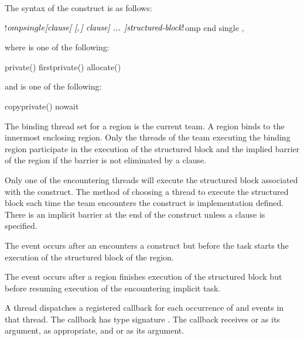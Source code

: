 \begin{fortranspecific}
The syntax of the  construct is as follows:

\begin{ompfPragma}
!$omp single \plc{[clause[ [},\plc{] clause] ... ]}
   \plc{structured-block}
!$omp end single \plc{[end_clause[ [},\plc{] end_clause] ... ]}
\end{ompfPragma}

where  is one of the following:

\begin{indentedcodelist}
private()
firstprivate()
allocate(\plc{[allocator: ]})
\end{indentedcodelist}

and  is one of the following:

\begin{indentedcodelist}
copyprivate()
nowait
\end{indentedcodelist}
\end{fortranspecific}

\binding
The binding thread set for a  region is the current team. A  region
binds to the innermost enclosing  region. Only the threads of the team
executing the binding  region participate in the execution of the structured
block and the implied barrier of the  region if the barrier is not eliminated by a
 clause.

\descr
Only one of the encountering threads will execute the structured block associated with the 
construct. The method of choosing a thread to execute the structured block each time the team encounters the construct
is implementation defined. There is an implicit barrier at the end of the  construct unless a
 clause is specified.

\events

The  event occurs after an  encounters a
 construct but before the task starts the execution of the structured
block of the  region.

The  event occurs after a  region finishes execution of the structured block
but before resuming execution of the encountering implicit task.


\tools

A thread dispatches a registered 
callback for each occurrence of  and
 events in that thread. The callback has type signature
. The callback receives
 or 
as its  argument, as appropriate, and
 or 
as its  argument.

